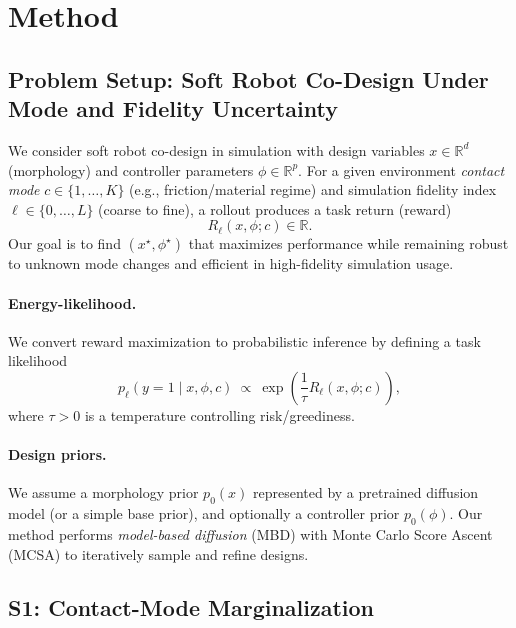 \section{Method}
\label{sec:method}

\subsection{Problem Setup: Soft Robot Co-Design Under Mode and Fidelity Uncertainty}
\label{subsec:setup}

We consider soft robot co-design in simulation with design variables
$x \in \mathbb{R}^d$ (morphology) and controller parameters $\phi \in \mathbb{R}^p$.
For a given environment \emph{contact mode} $c \in \{1,\dots,K\}$ (e.g., friction/material regime)
and simulation fidelity index $\ell \in \{0,\dots,L\}$ (coarse to fine),
a rollout produces a task return (reward)
\begin{equation}
R_{\ell}(x,\phi;c)\in \mathbb{R}.
\end{equation}
Our goal is to find $(x^\star,\phi^\star)$ that maximizes performance while remaining robust to
unknown mode changes and efficient in high-fidelity simulation usage.

\paragraph{Energy-likelihood.}
We convert reward maximization to probabilistic inference by defining a task likelihood
\begin{equation}
p_{\ell}(y=1 \mid x,\phi,c)
~\propto~
\exp\!\left(\frac{1}{\tau}R_{\ell}(x,\phi;c)\right),
\label{eq:task_likelihood}
\end{equation}
where $\tau>0$ is a temperature controlling risk/greediness.

\paragraph{Design priors.}
We assume a morphology prior $p_0(x)$ represented by a pretrained diffusion model
(or a simple base prior), and optionally a controller prior $p_0(\phi)$.
Our method performs \emph{model-based diffusion} (MBD) with Monte Carlo Score Ascent (MCSA)
to iteratively sample and refine designs.

\subsection{S1: Contact-Mode Marginalization}
\label{subsec:s1}

